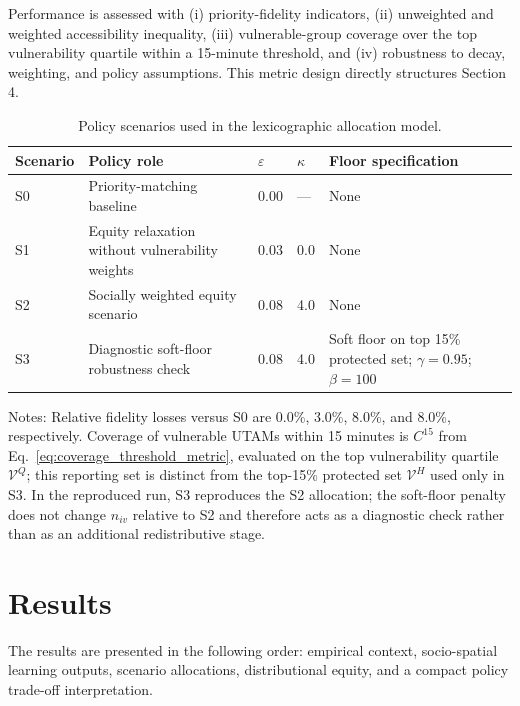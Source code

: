 \documentclass[final,5p,times,twocolumn,authoryear]{elsarticle}
\begin{document}
Performance is assessed with (i) priority-fidelity indicators, (ii) unweighted and weighted
accessibility inequality, (iii) vulnerable-group coverage over the top vulnerability quartile
within a 15-minute threshold, and (iv) robustness to decay, weighting, and policy
assumptions. This metric design directly structures Section 4.

\begin{table}[htbp]
\centering
\caption{Policy scenarios used in the lexicographic allocation model.}
\label{tab:scenarios}
\begin{threeparttable}
\footnotesize
\begin{tabularx}{\textwidth}{Z Y Z Z Y}
\toprule
Scenario & Policy role & $\varepsilon$ & $\kappa$ & Floor specification \\
\midrule
S0 & Priority-matching baseline & 0.00 & --- & None \\
S1 & Equity relaxation without vulnerability weights & 0.03 & 0.0 & None \\
S2 & Socially weighted equity scenario & 0.08 & 4.0 & None \\
S3 & Diagnostic soft-floor robustness check & 0.08 & 4.0 & Soft floor on top 15\% protected set; $\gamma=0.95$; $\beta=100$ \\
\bottomrule
\end{tabularx}
\begin{tablenotes}[flushleft]
\footnotesize
\item Notes: Relative fidelity losses versus S0 are 0.0\%, 3.0\%, 8.0\%, and 8.0\%,
respectively. Coverage of vulnerable UTAMs within 15 minutes is $C^{15}$ from
Eq.~\eqref{eq:coverage_threshold_metric}, evaluated on the top vulnerability quartile
$\mathcal{V}^{Q}$; this reporting set is distinct from the top-15\% protected set
$\mathcal{V}^{H}$ used only in S3. In the reproduced run, S3 reproduces the S2 allocation;
the soft-floor penalty does not change $n_{iv}$ relative to S2 and therefore acts as a
diagnostic check rather than as an additional redistributive stage.
\end{tablenotes}
\end{threeparttable}
\end{table}

\section{Results}

The results are presented in the following order: empirical context, socio-spatial
learning outputs, scenario allocations, distributional equity, and a compact policy
trade-off interpretation.
\end{document}
